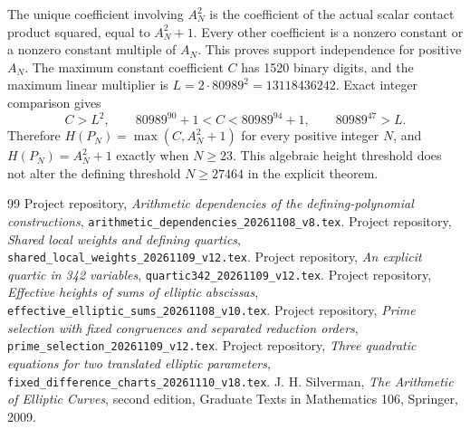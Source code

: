 \documentclass[11pt,a4paper]{article}
\theoremstyle{remark}\newtheorem{remark}[theorem]{Remark}
\begin{document}
The unique coefficient involving $A_N^2$ is the coefficient of the
actual scalar contact product squared, equal to $A_N^2+1$.
Every other coefficient is a nonzero constant or a nonzero constant
multiple of $A_N$. This proves support independence for positive
$A_N$. The maximum constant coefficient $C$ has 1520 binary digits,
and the maximum linear multiplier is
$L=2\cdot80989^2=13118436242$. Exact integer comparison gives
\[
 C>L^2,\qquad 80989^{90}+1<C<80989^{94}+1,\qquad 80989^{47}>L.
\]
Therefore $H(P_N)=\max(C,A_N^2+1)$ for every positive integer $N$,
and $H(P_N)=A_N^2+1$ exactly when $N\ge23$.
This algebraic height threshold does not alter the defining threshold
$N\ge27464$ in the explicit theorem.

\begin{thebibliography}{99}
 Project repository,
\emph{Arithmetic dependencies of the defining-polynomial constructions},
\nolinkurl{arithmetic_dependencies_20261108_v8.tex}.
 Project repository,
\emph{Shared local weights and defining quartics},
\nolinkurl{shared_local_weights_20261109_v12.tex}.
 Project repository,
\emph{An explicit quartic in 342 variables},
\nolinkurl{quartic342_20261109_v12.tex}.
 Project repository,
\emph{Effective heights of sums of elliptic abscissas},
\nolinkurl{effective_elliptic_sums_20261108_v10.tex}.
 Project repository,
\emph{Prime selection with fixed congruences and separated reduction orders},
\nolinkurl{prime_selection_20261109_v12.tex}.
 Project repository,
\emph{Three quadratic equations for two translated elliptic parameters},
\nolinkurl{fixed_difference_charts_20261110_v18.tex}.
 J. H. Silverman,
\emph{The Arithmetic of Elliptic Curves}, second edition,
Graduate Texts in Mathematics 106, Springer, 2009.
\end{thebibliography}
\end{document}

